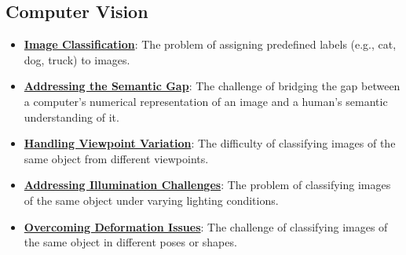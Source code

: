 \documentclass{article}%
\begin{document}
%
\subsection{Computer Vision}%
\label{subsec:ComputerVision}%
\begin{itemize}[leftmargin=*]%
\item \href{https://purdue.brightspace.com/d2l/common/assets/pdfjs-d2l-dist/1.0.14-legacy/web/viewer.html?file=%2Fcontent%2Fenforced%2F1095467-wl.202510.CS.24300.001%2F07L2-Vision.pdf%3Fou%3D1095467&lang=en-us&container=d2l-fileviewer-rendered-pdf&fullscreen=d2l-fileviewer-rendered-pdf-dialog&height=667#page=3}{\textbf{Image Classification}}: The problem of assigning predefined labels (e.g., cat, dog, truck) to images.%
\item \href{https://purdue.brightspace.com/d2l/common/assets/pdfjs-d2l-dist/1.0.14-legacy/web/viewer.html?file=%2Fcontent%2Fenforced%2F1095467-wl.202510.CS.24300.001%2F07L2-Vision.pdf%3Fou%3D1095467&lang=en-us&container=d2l-fileviewer-rendered-pdf&fullscreen=d2l-fileviewer-rendered-pdf-dialog&height=667#page=4}{\textbf{Addressing the Semantic Gap}}: The challenge of bridging the gap between a computer's numerical representation of an image and a human's semantic understanding of it.%
\item \href{https://purdue.brightspace.com/d2l/common/assets/pdfjs-d2l-dist/1.0.14-legacy/web/viewer.html?file=%2Fcontent%2Fenforced%2F1095467-wl.202510.CS.24300.001%2F07L2-Vision.pdf%3Fou%3D1095467&lang=en-us&container=d2l-fileviewer-rendered-pdf&fullscreen=d2l-fileviewer-rendered-pdf-dialog&height=667#page=6}{\textbf{Handling Viewpoint Variation}}: The difficulty of classifying images of the same object from different viewpoints.%
\item \href{https://purdue.brightspace.com/d2l/common/assets/pdfjs-d2l-dist/1.0.14-legacy/web/viewer.html?file=%2Fcontent%2Fenforced%2F1095467-wl.202510.CS.24300.001%2F07L2-Vision.pdf%3Fou%3D1095467&lang=en-us&container=d2l-fileviewer-rendered-pdf&fullscreen=d2l-fileviewer-rendered-pdf-dialog&height=667#page=7}{\textbf{Addressing Illumination Challenges}}: The problem of classifying images of the same object under varying lighting conditions.%
\item \href{https://purdue.brightspace.com/d2l/common/assets/pdfjs-d2l-dist/1.0.14-legacy/web/viewer.html?file=%2Fcontent%2Fenforced%2F1095467-wl.202510.CS.24300.001%2F07L2-Vision.pdf%3Fou%3D1095467&lang=en-us&container=d2l-fileviewer-rendered-pdf&fullscreen=d2l-fileviewer-rendered-pdf-dialog&height=667#page=8}{\textbf{Overcoming Deformation Issues}}: The challenge of classifying images of the same object in different poses or shapes.%

\end{itemize}
\end{document}
